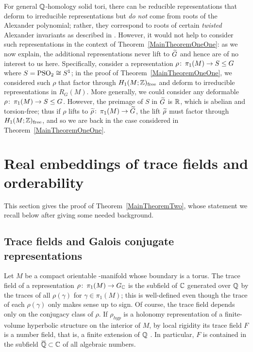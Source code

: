 \documentclass[tikz, sepfignums, defaultenums]{nmd/article}
\newcommand{\RG}[1]{\mathit{R}_{G}\left(#1\right)}
\newcommand{\GC}{G_\C}
\newcommand{\rhohyp}{\rho_{\mathit{hyp}}}
\newcommand{\Honefree}{H_1(M; \Z)_{\mathrm{free}}}
\begin{document}
\begin{remark}
  For general ${\mathbb Q}$-homology solid tori, there can be reducible
  representations that deform to irreducible representations but
  \emph{do not} come from roots of the Alexander polynomial; rather,
  they correspond to roots of certain \emph{twisted} Alexander
  invariants as described in \cite{HeusenerPorti2005}.  However, it
  would not help to consider such representations in the context of
  Theorem~\ref{MainTheoremOneOne}: as we now explain, the additional
  representations never lift to $\Gtil$ and hence are of no interest
  to us here.  Specifically, consider a representation
  $\rho \colon\thinspace \pi_1(M) \to S \leq G$ where $S = \mathrm{PSO}_2 \cong S^1$; in
  the proof of Theorem~\ref{MainTheoremOneOne}, we considered such
  $\rho$ that factor through $\Honefree$ and deform to irreducible
  representations in $\RG{M}$.  More generally, we could consider any
  deformable $\rho \colon\thinspace \pi_1(M) \to S \leq G$.  However, the
  preimage of $S$ in $\Gtil$ is ${\mathbb R}$, which is abelian and
  torsion-free; thus if $\rho$ lifts to
  $\rhotil \maps \pi_1(M) \to \Gtil$, the lift $\rhotil$ must factor
  through $\Honefree$, and so we are back in the case considered in
  Theorem~\ref{MainTheoremOneOne}.
\end{remark}

\section{Real embeddings of trace fields and orderability}
\label{sec:realtraces}

This section gives the proof of Theorem~\ref{MainTheoremTwo}, whose
statement we recall below after giving some needed background.

\subsection{Trace fields and Galois conjugate representations}  
\label{sec:galois}

Let $M$ be a compact orientable \3-manifold whose boundary is a torus.
The trace field of a representation $\rho \maps \pi_1(M) \to \GC$ is
the subfield of ${\mathbb C}$ generated over ${\mathbb Q}$ by the traces of all
$\rho(\gamma)$ for $\gamma \in \pi_1(M)$; this is well-defined even
though the trace of each $\rho(\gamma)$ only makes sense up to sign.
Of course, the trace field depends only on the conjugacy class of
$\rho$.  If $\rhohyp$ is a holonomy representation of a finite-volume
hyperbolic structure on the interior of $M$, by local rigidity its
trace field $F$ is a number field, that is, a finite extension of ${\mathbb Q}$
\cite[Theorem 3.1.2]{MaclachlanReid2003}.  In particular, $F$ is
contained in the subfield $\QQbar \subset \C$ of all algebraic
numbers.
\end{document}
